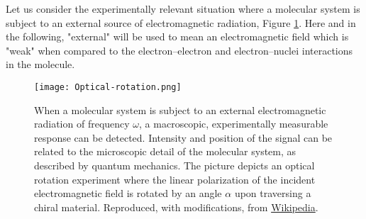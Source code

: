 Let us consider the experimentally relevant situation where a molecular
system is subject to an external source of electromagnetic radiation,
Figure \ref{fig:OR}.
Here and in the following, "external" will be used to mean an
electromagnetic field which is "weak" when compared to the
electron--electron and electron--nuclei interactions in the molecule.

\begin{figure}[tb]
  \centering
  \texttt{[image: Optical-rotation.png]}
  \caption{
  When a molecular system is subject to an external electromagnetic
  radiation of frequency $\omega$, a macroscopic, experimentally
  measurable response can be detected.
  Intensity and position of the signal can be related to the microscopic
  detail of the molecular system, as described by quantum mechanics.
  The picture depicts an optical rotation experiment where
  the linear polarization of the incident electromagnetic field
  is rotated by an angle $\alpha$ upon traversing a chiral material.
  Reproduced, with modifications, from \href{https://commons.wikimedia.org/wiki/File:Optical-rotation.svg}{Wikipedia}.
  }
  \label{fig:OR}
\end{figure}

